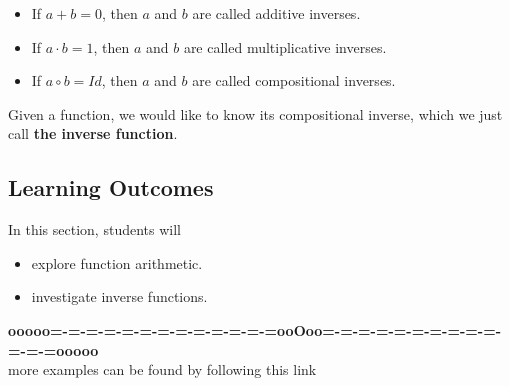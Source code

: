 \documentclass{ximera}
\begin{document}
\begin{itemize}
\item If $a + b = 0$, then $a$ and $b$ are called additive inverses.
\item If $a \cdot b = 1$, then $a$ and $b$ are called multiplicative inverses.
\item If $a \circ b = Id$, then $a$ and $b$ are called compositional inverses.
\end{itemize}


Given a function, we would like to know its compositional inverse, which we just call \textbf{\textcolor{purple!85!blue}{the inverse function}}.







\subsection{Learning Outcomes}


\begin{sectionOutcomes}
In this section, students will 

\begin{itemize}
\item explore function arithmetic.
\item investigate inverse functions.
\end{itemize}
\end{sectionOutcomes}













\begin{center}
\textbf{\textcolor{green!50!black}{ooooo=-=-=-=-=-=-=-=-=-=-=-=-=ooOoo=-=-=-=-=-=-=-=-=-=-=-=-=ooooo}} \\

more examples can be found by following this link\\ 

\end{center}
\end{document}
